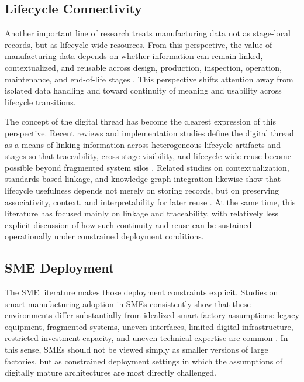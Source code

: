 \documentclass[systems,article,submit,pdftex,moreauthors]{Definitions/mdpi}
\begin{document}
\subsection{Lifecycle Connectivity}
\label{sec:lifecycle_connectivity}

Another important line of research treats manufacturing data not as stage-local records, but as lifecycle-wide resources. From this perspective, the value of manufacturing data depends on whether information can remain linked, contextualized, and reusable across design, production, inspection, operation, maintenance, and end-of-life stages \cite{ren2019bigdata, tao2018datadriven, bernstein2018contextualising, hedberg2017lift}. This perspective shifts attention away from isolated data handling and toward continuity of meaning and usability across lifecycle transitions.

The concept of the digital thread has become the clearest expression of this perspective. Recent reviews and implementation studies define the digital thread as a means of linking information across heterogeneous lifecycle artifacts and stages so that traceability, cross-stage visibility, and lifecycle-wide reuse become possible beyond fragmented system silos \cite{abdelaty2024conceptualizing, zhang2024digitalthread, bianchini2024digitalthread, hedberg2020graphs}. Related studies on contextualization, standards-based linkage, and knowledge-graph integration likewise show that lifecycle usefulness depends not merely on storing records, but on preserving associativity, context, and interpretability for later reuse \cite{kwon2020enriching, schmidt2018flow, monnier2022methodology}. At the same time, this literature has focused mainly on linkage and traceability, with relatively less explicit discussion of how such continuity and reuse can be sustained operationally under constrained deployment conditions.

\subsection{SME Deployment}
\label{sec:sme_deployment}

The SME literature makes those deployment constraints explicit. Studies on smart manufacturing adoption in SMEs consistently show that these environments differ substantially from idealized smart factory assumptions: legacy equipment, fragmented systems, uneven interfaces, limited digital infrastructure, restricted investment capacity, and uneven technical expertise are common \cite{mittal2018maturity, mittal2020adoption, ghobakhloo2019adoption, krishnan2024challenges}. In this sense, SMEs should not be viewed simply as smaller versions of large factories, but as constrained deployment settings in which the assumptions of digitally mature architectures are most directly challenged.
\end{document}
